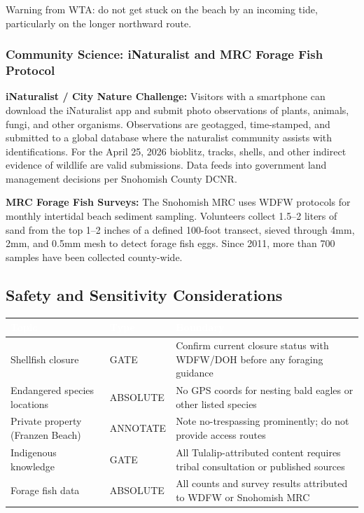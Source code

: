 \documentclass[11pt,letterpaper]{article}
\newcommand{\tableheader}[1]{\textbf{\sffamily\textcolor{white}{#1}}}
\begin{document}
Warning from WTA: do not get stuck on the beach by an incoming tide, particularly on the longer northward route.

\subsubsection{Community Science: iNaturalist and MRC Forage Fish Protocol}

\textbf{iNaturalist / City Nature Challenge:} Visitors with a smartphone can download the iNaturalist app and submit photo observations of plants, animals, fungi, and other organisms. Observations are geotagged, time-stamped, and submitted to a global database where the naturalist community assists with identifications. For the April 25, 2026 bioblitz, tracks, shells, and other indirect evidence of wildlife are valid submissions. Data feeds into government land management decisions per Snohomish County DCNR.

\textbf{MRC Forage Fish Surveys:} The Snohomish MRC uses WDFW protocols for monthly intertidal beach sediment sampling. Volunteers collect 1.5--2 liters of sand from the top 1--2 inches of a defined 100-foot transect, sieved through 4mm, 2mm, and 0.5mm mesh to detect forage fish eggs. Since 2011, more than 700 samples have been collected county-wide.

\subsection{Safety and Sensitivity Considerations}

\begin{center}
\begin{tabularx}{\textwidth}{L{3.5cm}L{2cm}X}
\toprule
{}
\tableheader{Topic} & \tableheader{Type} & \tableheader{Boundary} \\
\midrule
Shellfish closure & GATE & Confirm current closure status with WDFW/DOH before any foraging guidance \\
Endangered species locations & ABSOLUTE & No GPS coords for nesting bald eagles or other listed species \\
Private property (Franzen Beach) & ANNOTATE & Note no-trespassing prominently; do not provide access routes \\
Indigenous knowledge & GATE & All Tulalip-attributed content requires tribal consultation or published sources \\
Forage fish data & ABSOLUTE & All counts and survey results attributed to WDFW or Snohomish MRC \\
\bottomrule
\end{tabularx}
\end{center}
\end{document}
